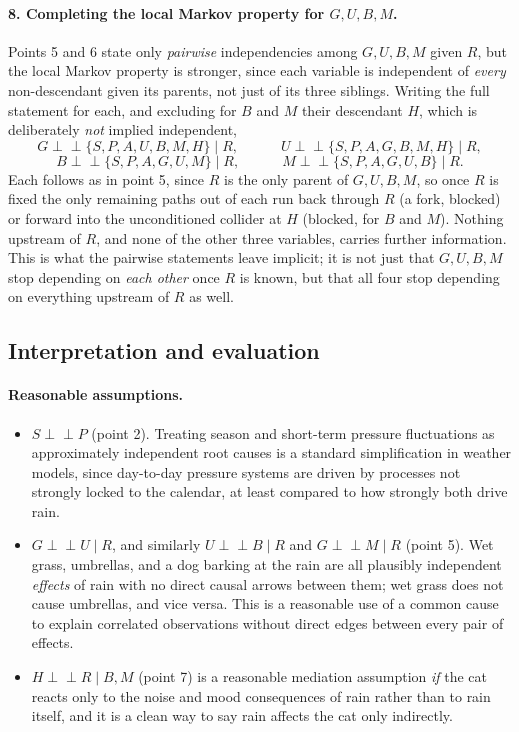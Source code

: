 \documentclass[11pt]{article}
\newcommand{\indep}{\perp\!\!\!\perp}
\begin{document}
\paragraph{8. Completing the local Markov property for $G,U,B,M$.} Points 5 and
6 state only \emph{pairwise} independencies among $G,U,B,M$ given $R$, but the
local Markov property is stronger, since each variable is independent of
\emph{every} non-descendant given its parents, not just of its three siblings.
Writing the full statement for each, and excluding for $B$ and $M$ their
descendant $H$, which is deliberately \emph{not} implied independent,
\[
  G \indep \{S,P,A,U,B,M,H\} \mid R, \qquad\quad
  U \indep \{S,P,A,G,B,M,H\} \mid R,
\]
\[
  B \indep \{S,P,A,G,U,M\} \mid R, \qquad\quad
  M \indep \{S,P,A,G,U,B\} \mid R.
\]
Each follows as in point 5, since $R$ is the only parent of $G,U,B,M$, so once
$R$ is fixed the only remaining paths out of each run back through $R$ (a fork,
blocked) or forward into the unconditioned collider at $H$ (blocked, for $B$ and
$M$). Nothing upstream of $R$, and none of the other three variables, carries
further information. This is what the pairwise statements leave implicit; it is
not just that $G,U,B,M$ stop depending on \emph{each other} once $R$ is known,
but that all four stop depending on everything upstream of $R$ as well.

\subsection*{Interpretation and evaluation}

\paragraph{Reasonable assumptions.}
\begin{itemize}[leftmargin=*]
  \item $S \indep P$ (point 2). Treating season and short-term pressure
  fluctuations as approximately independent root causes is a standard
  simplification in weather models, since day-to-day pressure systems are
  driven by processes not strongly locked to the calendar, at least compared to
  how strongly both drive rain.
  \item $G \indep U \mid R$, and similarly $U \indep B \mid R$ and
  $G \indep M \mid R$ (point 5). Wet grass, umbrellas, and a dog barking at the
  rain are all plausibly independent \emph{effects} of rain with no direct
  causal arrows between them; wet grass does not cause umbrellas, and vice
  versa. This is a reasonable use of a common cause to explain correlated
  observations without direct edges between every pair of effects.
  \item $H \indep R \mid B,M$ (point 7) is a reasonable mediation assumption
  \emph{if} the cat reacts only to the noise and mood consequences of rain
  rather than to rain itself, and it is a clean way to say rain affects the cat
  only indirectly.
\end{itemize}
\end{document}
